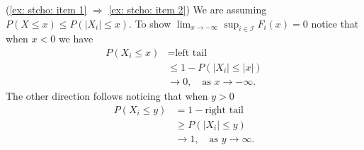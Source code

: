 \begin{exerciseproof}
(\ref{ex: stcho: item 1} $\Longrightarrow$ \ref{ex: stcho: item 2})
We are assuming $P(X\leq x)\leq P(|X_i|\leq x)$. To show  $\lim_{x\rightarrow-\infty} \sup_{i\in \mathcal I} F_i(x) = 0$ notice that when $x < 0$ we have
\begin{align*}
P(X_i\leq x) &= \text{left tail} \\
&\leq 1 - P(|X_i|\leq |x|) \\
&\rightarrow 0,\quad\text{as $x\rightarrow -\infty$.}
\end{align*}
The other direction follows noticing that when $y>0$
\begin{align*}
P(X_i\leq y) &= 1-\text{right tail} \\
&\geq P(|X_i|\leq y) \\
&\rightarrow 1,\quad\text{as $y\rightarrow \infty$.}
\end{align*}


\end{exerciseproof}
